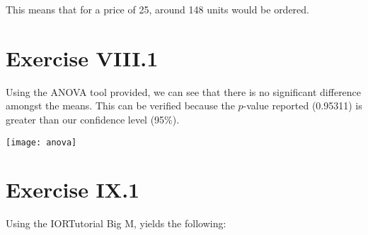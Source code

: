 \documentclass[titlepage, letterpaper]{article}
\begin{document}
This means that for a price of 25, around 148 units would be ordered.


\section{Exercise VIII.1} %
\label{sec:exercise_viii_1}
Using the ANOVA tool provided, we can see that there is no significant difference amongst the means.
This can be verified because the $p$-value reported (0.95311) is greater than our confidence level (95\%).

\texttt{[image: anova]}

\section{Exercise IX.1} %
\label{sec:exercise_ix_1}

Using the IORTutorial Big M, yields the following:
\end{document}
